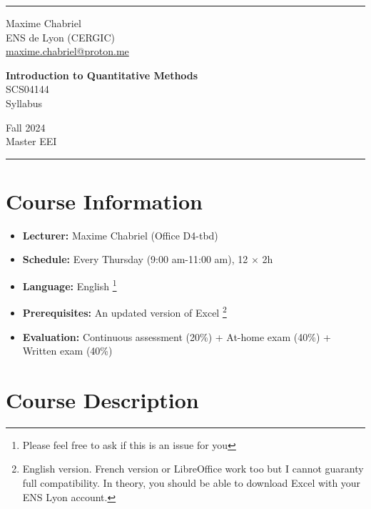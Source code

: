 \documentclass{article}
\makeatletter
\def\author{Maxime Chabriel} \def\instit{ENS de Lyon (CERGIC)} \def\email{maxime.chabriel@proton.me}
\makeatother
\begin{document}
	\par\noindent\rule{\textwidth}{1pt}
	\begin{minipage}[c]{.32\linewidth}
		\vspace{0.5cm}
		\small{ \author \\
			\instit \\
			\href{mailto:\email}{\email} \\
		}
	\end{minipage}
	\begin{minipage}[c]{.33\linewidth}
		\begin{center}
			\large{\textbf{Introduction to Quantitative Methods}} \\
			\normalsize{SCS04144} \\
			\normalsize{Syllabus}
		\end{center}
	\end{minipage}
	\begin{minipage}[c]{.32\linewidth}
		\raggedleft
		\small{ Fall 2024 \\
			Master EEI \\
		}
	\end{minipage}
	\par\noindent\rule{\textwidth}{1pt}
	
	\section*{Course Information}
	
	\begin{itemize}
		\item \textbf{Lecturer:} Maxime Chabriel (Office D4-tbd)
		\item \textbf{Schedule:} Every Thursday (9:00 am-11:00 am), 12 $\times$ 2h
		\item \textbf{Language:} English \footnote{Please feel free to ask if this is an issue for you} 
		\item \textbf{Prerequisites:} An updated version of Excel \footnote{English version. French version or LibreOffice work too but I cannot guaranty full compatibility. In theory, you should be able to download Excel with your ENS Lyon account.} 
		\item \textbf{Evaluation:} Continuous assessment (20\%) + At-home exam (40\%) + Written exam (40\%) 
	\end{itemize}
	
	\section*{Course Description}
	
\end{document}
